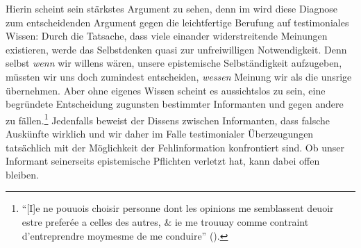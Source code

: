\begin{nummerierung}
 Hierin scheint  sein stärkstes Argument zu
 sehen, denn im  wird diese Diagnose zum
 entscheidenden Argument gegen die leichtfertige Berufung auf testimoniales
 Wissen: Durch die Tatsache, dass viele einander widerstreitende Meinungen
 existieren, werde das Selbstdenken quasi zur unfreiwilligen Notwendigkeit. Denn
 selbst \emph{wenn} wir willens wären, unsere epistemische Selbständigkeit
 aufzugeben, müssten wir uns doch zumindest entscheiden, \emph{wessen} Meinung
 wir als die unsrige übernehmen. Aber ohne eigenes Wissen scheint es
 aussichtslos zu sein, eine begründete Entscheidung zugunsten bestimmter
 Informanten und gegen andere zu
 fällen.\footnote{\enquote{[I]e ne pouuois
 choisir personne dont les opinions me semblassent deuoir estre
 prefer{\'e}e a celles des autres, {\&} ie me trouuay comme
 contraint d'entreprendre moymesme de me conduire}
 \mkbibparens{\cite[][VI: 16.26--29]{Descartes:OeuvresdeDescartes1983}}.}
 Jedenfalls beweist der Dissens zwischen Informanten, dass falsche Auskünfte wirklich und wir daher im
 Falle testimonialer Überzeugungen tatsächlich mit der Möglichkeit der
 Fehlinformation konfrontiert sind. Ob unser Informant seinerseits
 epistemische Pflichten verletzt hat, kann dabei offen bleiben.
 

\end{nummerierung}
